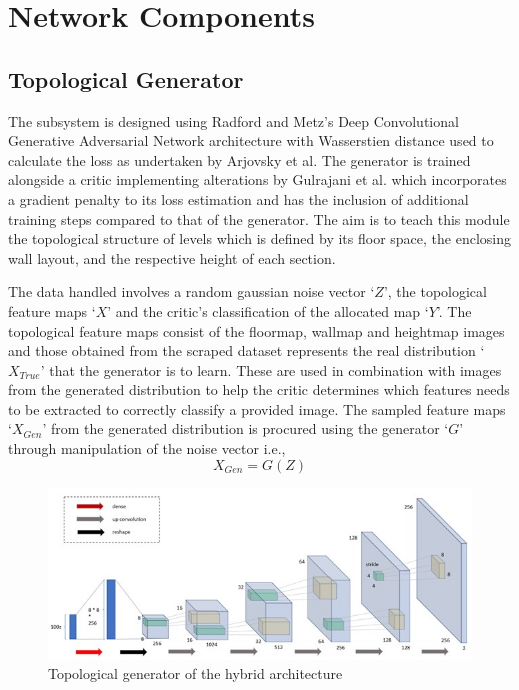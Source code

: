 \documentclass{Configuration_Files/PoliMi3i_thesis}
\begin{document}
\section{Network Components}
\subsection{Topological Generator}
The subsystem is designed using Radford and Metz’s Deep Convolutional 
Generative Adversarial Network architecture with Wasserstien distance used to 
calculate the loss as undertaken by Arjovsky et al. The generator is trained alongside 
a critic implementing alterations by Gulrajani et al. which incorporates a gradient 
penalty to its loss estimation and has the inclusion of additional training steps 
compared to that of the generator. The aim is to teach this module the topological 
structure of levels which is defined by its floor space, the enclosing wall layout, and 
the respective height of each section.

The data handled involves a random gaussian noise vector ‘$Z$’, the topological feature 
maps ‘$X$’ and the critic’s classification of the allocated map ‘$Y$’. The topological 
feature maps consist of the floormap, wallmap and heightmap images and those obtained from 
the scraped dataset represents the real distribution ‘$X_{True}$’ that the generator is to learn. 
These are used in combination with images from the generated distribution to help the critic 
determines which features needs to be extracted to correctly classify a provided image. 
The sampled feature maps ‘$X_{Gen}$’ from the generated distribution is 
procured using the generator ‘$G$’ through manipulation of the noise vector i.e.,
\begin{equation} \label{eq:wgen}
X_{Gen} = G(Z)
\end{equation}
\begin{figure}[H]
    \centering
    \includegraphics[width=1\textwidth]{wgan.jpg}
    \caption{Topological generator of the hybrid architecture}
    \label{fig:wgan}
\end{figure}
\newpage
\end{document}
